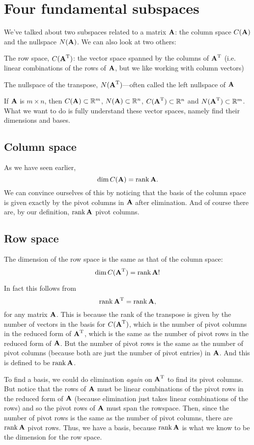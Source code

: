\section{Four fundamental subspaces}

We've talked about two subspaces related to a matrix $\boldsymbol{\mathbf{A}}$: the column space $C(\boldsymbol{\mathbf{A}})$ and the nullspace $N(\boldsymbol{\mathbf{A}})$. We can also look at two others:
\bit
\item The row space, $C(\boldsymbol{\mathbf{A}}^\mathrm{T})$: the vector space spanned by the columns of $\boldsymbol{\mathbf{A}}^\mathrm{T}$ (i.e. linear combinations of the rows of $\boldsymbol{\mathbf{A}}$, but we like working with column vectors)
\item The nullspace of the transpose, $N(\boldsymbol{\mathbf{A}}^\mathrm{T})$---often called the left nullspace of $\boldsymbol{\mathbf{A}}$
\eit

If $\boldsymbol{\mathbf{A}}$ is $m \times n$, then $C(\boldsymbol{\mathbf{A}}) \subset \mathbb{R}^m$, $N(\boldsymbol{\mathbf{A}}) \subset \mathbb{R}^n$, $C(\boldsymbol{\mathbf{A}}^\mathrm{T}) \subset \mathbb{R}^n$ and $N(\boldsymbol{\mathbf{A}}^\mathrm{T}) \subset \mathbb{R}^m$. What we want to do is fully understand these vector spaces, namely find their dimensions and bases.

\subsection{Column space}
As we have seen earlier, 
\[ \mathrm{dim}\, C(\boldsymbol{\mathbf{A}}) = \mathrm{rank}\, \boldsymbol{\mathbf{A}}. \]
We can convince ourselves of this by noticing that the basis of the column space is given exactly by the pivot columns in $\boldsymbol{\mathbf{A}}$ after elimination. And of course there are, by our definition, $\mathrm{rank}\, \boldsymbol{\mathbf{A}}$ pivot columns.

\subsection{Row space}
The dimension of the row space is the same as that of the column space:
\[ \mathrm{dim}\, C(\boldsymbol{\mathbf{A}}^\mathrm{T}) = \mathrm{rank}\, \boldsymbol{\mathbf{A}}! \]

\brm
In fact this follows from
\[ \mathrm{rank}\, \boldsymbol{\mathbf{A}}^\mathrm{T} = \mathrm{rank}\, \boldsymbol{\mathbf{A}}, \]
for any matrix $\boldsymbol{\mathbf{A}}$. This is because the rank of the transpose is given by the number of vectors in the basis for $C(\boldsymbol{\mathbf{A}}^\mathrm{T})$, which is the number of pivot columns in the reduced form of $\boldsymbol{\mathbf{A}}^\mathrm{T}$, which is the same as the number of pivot rows in the reduced form of $\boldsymbol{\mathbf{A}}$. But the number of pivot rows is the same as the number of pivot columns (because both are just the number of pivot entries) in $\boldsymbol{\mathbf{A}}$. And this is defined to be $\mathrm{rank}\, \boldsymbol{\mathbf{A}}$.
\erm

To find a basis, we could do elimination \textit{again} on $\boldsymbol{\mathbf{A}}^\mathrm{T}$ to find its pivot columns. But notice that the rows of $\boldsymbol{\mathbf{A}}$ must be linear combinations of the pivot rows in the reduced form of $\boldsymbol{\mathbf{A}}$ (because elimination just takes linear combinations of the rows) and so the pivot rows of $\boldsymbol{\mathbf{A}}$ must span the rowspace. Then, since the number of pivot rows is the same as the number of pivot columns, there are $\mathrm{rank}\, \boldsymbol{\mathbf{A}}$ pivot rows. Thus, we have a basis, because $\mathrm{rank}\, \boldsymbol{\mathbf{A}}$ is what we know to be the dimension for the row space. 


